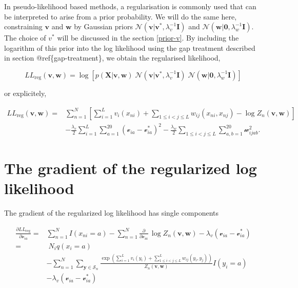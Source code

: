 \documentclass[12pt,a4paper,twoside]{book}
\newcommand{\eq}{\!=\!}
\newcommand{\Gauss}{\mathcal{N}}
\newcommand{\I}{\mathbf{I}}
\newcommand{\LLreg}{L\!L_\mathrm{reg}}
\newcommand{\Sn}{\mathcal{S}_n}
\renewcommand{\v}{\mathbf{v}}
\newcommand{\via}{\mathcal{v}_{ia}}
\newcommand{\w}{\mathbf{w}}
\newcommand{\wijab}{\mathcal{w}_{ijab}}
\newcommand{\X}{\mathbf{X}}
\theoremstyle{definition}
\theoremstyle{definition}
\theoremstyle{remark}
\begin{document}
In pseudo-likelihood based methods, a regularisation is commonly used
that can be interpreted to arise from a prior probability. We will do
the same here, constraining \(\v\) and \(\w\) by Gaussian priors
\(\mathcal{N}( \v | \v^*, \lambda_v^{-1} \I)\) and
\(\mathcal{N}( \w |\boldsymbol 0, \lambda_w^{-1} \I)\). The choice of
\(v^*\) will be discussed in the section \ref{prior-v}. By including the
logarithm of this prior into the log likelihood using the gap treatment
described in section @ref\{gap-treatment\}, we obtain the regularised
likelihood,

\begin{equation}
    \LLreg(\v,\w)  = \log \left[ p(\X | \v,\w) \;  \Gauss (\v | \v^*, \lambda_v^{-1} \I)  \; \Gauss( \w | \boldsymbol 0, \lambda_w^{-1} \I) \right] 
\end{equation}

or explicitely,

\begin{align}
    \LLreg(\v,\w) =& \sum_{n=1}^N  \left[ \sum_{i=1}^L v_i(x_{ni}) + \sum_{1\le i<j\le L} w_{ij}(x_{ni},x_{nj}) - \log Z_n(\v,\w) \right] \\
                    & - \frac{\lambda_v}{2} \!\! \sum_{i=1}^L \sum_{a=1}^{20} (\via - \via^*)^2  - \frac{\lambda_w}{2}  \sum_{1 \le i < j \le L} \sum_{a,b=1}^{20} \wijab^2 .
\end{align}

\section{The gradient of the regularized log
likelihood}\label{the-gradient-of-the-regularized-log-likelihood}

The gradient of the regularized log likelihood has single components

\begin{align}
    \frac{\partial \LLreg}{\partial \via} =& \sum_{n=1}^N I(x_{ni}=a) - \sum_{n=1}^N \frac{\partial}{\partial \via} \, \log Z_n(\v,\w) - \lambda_v (\via - \via^*)\\
                                          =& \; N_i q(x_i \eq a) \\
                                          & - \sum_{n=1}^N \sum_{\mathbf{y} \in \Sn} \frac{  \exp \left( \sum_{i=1}^L v_i(y_i) + \sum_{1 \le i<j \le L}^L w_{ij}(y_i,y_j) \right) }{Z_n(\v,\w)}  I(y_i=a) \\
                                          & - \lambda_v (\via - \via^*) 
\label{eq:gradient-LLreg-single}
\end{align}
\end{document}
